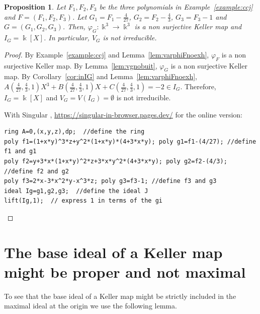 \documentclass[11pt,reqno]{amsart}
\newtheorem{proposition}[theorem]{Proposition}
\theoremstyle{definition}
\newcommand{\mbk}{\mbox{$\Bbbk$}}
\begin{document}
\begin{proposition}\label{prop:IFnoPropi}
Let $F_1,F_2,F_3$ be the three polynomials in {\rm Example~\ref{example:ccj}} and $F=(F_1,F_2,F_3)$. 
Let $G_1=F_1-\tfrac{4}{27}$, $G_2=F_2-\tfrac{4}{3}$, $G_3=F_3-1$ and $G=(G_1,G_2,G_3)$. 
Then, $\varphi_G:\mbk^3\to \mbk^3$ is a non surjective Keller map and $I_G=\mbk[X]$. 
In particular, $V_G$ is not irreducible. 
\end{proposition}
\begin{proof} 
By Example~\ref{example:ccj} and Lemma~\ref{lem:varphiFnoexh}, 
$\varphi_F$ is a non surjective Keller map.
By Lemma~\ref{lem:vgnobuit}, $\varphi_G$ is a non surjective Keller map. 
By Corollary~\ref{cor:inIG} and Lemma~\ref{lem:varphiFnoexh}, $A(\tfrac{4}{27},\tfrac{4}{3},1)X^3+B(\tfrac{4}{27},\tfrac{4}{3},1)X+C(\tfrac{4}{27},\tfrac{4}{3},1)=-2\in I_G$. Therefore, $I_G=\mbk[X]$ and $V_G=V(I_G)=\emptyset$ is not irreducible. 

With {\sc Singular} \cite{dgps}, \url{https://singular-in-browser.pages.dev/}
for the online version:
\begin{verbatim}
ring A=0,(x,y,z),dp;  //define the ring
poly f1=(1+x*y)^3*z+y^2*(1+x*y)*(4+3*x*y); poly g1=f1-(4/27); //define f1 and g1
poly f2=y+3*x*(1+x*y)^2*z+3*x*y^2*(4+3*x*y); poly g2=f2-(4/3); //define f2 and g2
poly f3=2*x-3*x^2*y-x^3*z; poly g3=f3-1; //define f3 and g3
ideal Ig=g1,g2,g3;  //define the ideal J 
lift(Ig,1);  // express 1 in terms of the gi
\end{verbatim}
\end{proof}

\section{The base ideal of a Keller map might be proper and not maximal}

To see that the base ideal of a Keller map might be strictly included in the maximal
ideal at the origin we use the following lemma. 
\end{document}
